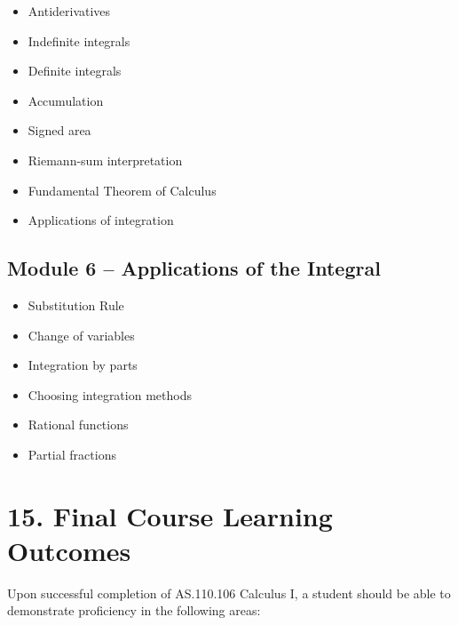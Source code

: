 \documentclass[11pt]{article}
\begin{document}
\begin{itemize}[label=$\square$]
    \item Antiderivatives
    \item Indefinite integrals
    \item Definite integrals
    \item Accumulation
    \item Signed area
    \item Riemann-sum interpretation
    \item Fundamental Theorem of Calculus
    \item Applications of integration
\end{itemize}

\subsection*{Module 6 -- Applications of the Integral}

\begin{itemize}[label=$\square$]
    \item Substitution Rule
    \item Change of variables
    \item Integration by parts
    \item Choosing integration methods
    \item Rational functions
    \item Partial fractions
\end{itemize}

\section{15. Final Course Learning Outcomes}

Upon successful completion of AS.110.106 Calculus I, a student should be able
to demonstrate proficiency in the following areas:
\end{document}
